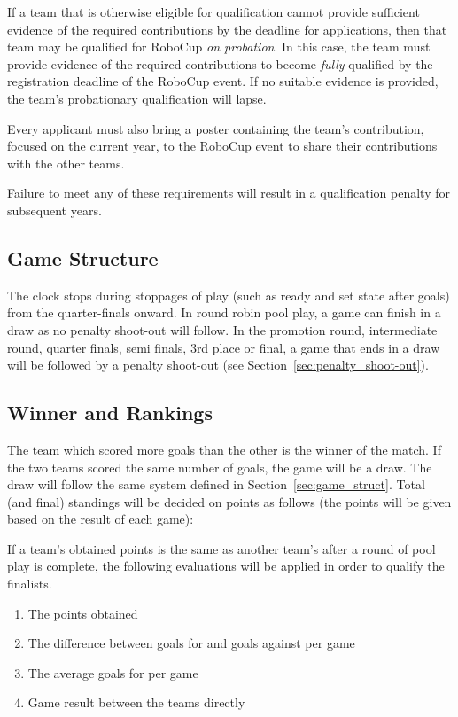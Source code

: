 \documentclass[12pt]{article}
\begin{document}
If a team that is otherwise eligible for qualification cannot provide sufficient evidence of the required contributions by the deadline for applications, then that team may be qualified for RoboCup \textit{on probation}.
In this case, the team must provide evidence of the required contributions to become \textit{fully} qualified by the registration deadline of the RoboCup event.
If no suitable evidence is provided, the team's probationary qualification will lapse.

Every applicant must also bring a poster containing the team's contribution, focused on the current year, to the RoboCup event to share their contributions with the other teams.

Failure to meet any of these requirements will result in a qualification penalty for subsequent years.

\subsection{Game Structure}

The clock stops during stoppages of play (such as ready and set state after goals) from the quarter-finals onward.  In round robin pool play, a game can finish in a draw as no penalty shoot-out will follow. In the promotion round, intermediate round, quarter finals, semi finals, 3rd place or final, a game that ends in a draw will be followed by a penalty shoot-out (see Section~\ref{sec:penalty_shoot-out}).

\subsection{Winner and Rankings}
\label{sec:rankings}

The team which scored more goals than the other is the winner of the match. If the two teams scored the same number of goals, the game will be a draw. The draw will follow the same system defined in Section~\ref{sec:game_struct}. Total (and final) standings will be decided on points as follows (the points will be given based on the result of each game):


If a team's obtained points is the same as another team's after a round of pool play is complete, the following evaluations will be applied in order to qualify the finalists.

\begin{enumerate}

\item The points obtained

\item The difference between goals for and goals against per game

\item The average goals for per game

\item Game result between the teams directly

\end{enumerate}
\end{document}
